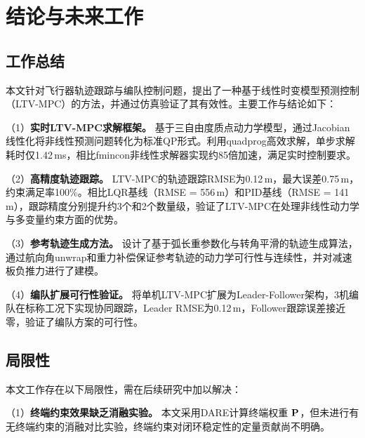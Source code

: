 \section{结论与未来工作}\label{sec:conclusion}

\subsection{工作总结}

本文针对飞行器轨迹跟踪与编队控制问题，提出了一种基于线性时变模型预测控制（LTV-MPC）的方法，并通过仿真验证了其有效性。主要工作与结论如下：

（1）\textbf{实时LTV-MPC求解框架。} 基于三自由度质点动力学模型，通过Jacobian线性化将非线性预测问题转化为标准QP形式。利用quadprog高效求解，单步求解耗时仅1.42\,ms，相比fmincon非线性求解器实现约85倍加速，满足实时控制要求。

（2）\textbf{高精度轨迹跟踪。} LTV-MPC的轨迹跟踪RMSE为0.12\,m，最大误差0.75\,m，约束满足率100\%。相比LQR基线（RMSE = 556\,m）和PID基线（RMSE = 141\,m），跟踪精度分别提升约3个和2个数量级，验证了LTV-MPC在处理非线性动力学与多变量约束方面的优势。

（3）\textbf{参考轨迹生成方法。} 设计了基于弧长重参数化与转角平滑的轨迹生成算法，通过航向角unwrap和重力补偿保证参考轨迹的动力学可行性与连续性，并对减速板负推力进行了建模。

（4）\textbf{编队扩展可行性验证。} 将单机LTV-MPC扩展为Leader-Follower架构，3机编队在标称工况下实现协同跟踪，Leader RMSE为0.12\,m，Follower跟踪误差接近零，验证了编队方案的可行性。

\subsection{局限性}

本文工作存在以下局限性，需在后续研究中加以解决：

（1）\textbf{终端约束效果缺乏消融实验。} 本文采用DARE计算终端权重 $\mathbf{P}$，但未进行有无终端约束的消融对比实验，终端约束对闭环稳定性的定量贡献尚不明确。

